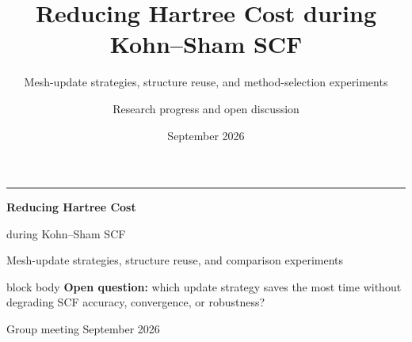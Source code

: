 \documentclass[aspectratio=169,11pt]{beamer}
\title{Reducing Hartree Cost during Kohn--Sham SCF}
\subtitle{Mesh-update strategies, structure reuse, and method-selection experiments}
\author{Research progress and open discussion}
\date{September 2026}
\begin{document}
\begin{frame}[plain]
  \vspace{0.35cm}
  {\color{teal}\rule{\textwidth}{1.3pt}}
  \vspace{0.4cm}

  {\fontsize{25}{31}\selectfont\bfseries\sffamily\color{navy}
   Reducing Hartree Cost\par
   \vspace{0.15cm}during Kohn--Sham SCF\par}

  \vspace{0.4cm}
  {\Large\sffamily\color{muted}
   Mesh-update strategies, structure reuse, and comparison experiments}

  \vspace{0.5cm}
  \begin{beamercolorbox}[rounded=true,sep=0.55em,wd=0.92\textwidth]{block body}
    \centering
    \textbf{Open question:} which update strategy saves the most time
    \alert{without degrading SCF accuracy, convergence, or robustness?}
  \end{beamercolorbox}

  \vfill
  \hfill{\color{muted}\sffamily Group meeting \quad September 2026}
\end{frame}
\end{document}
